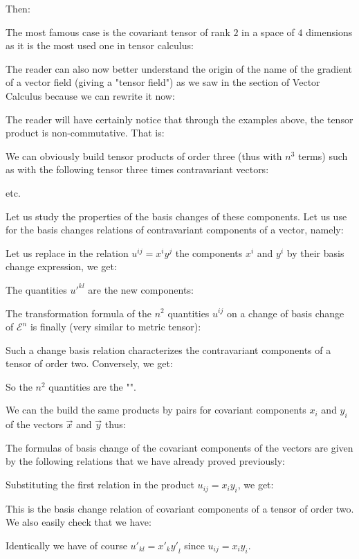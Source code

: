 	Then:
	
	The most famous case is the covariant tensor of rank $2$ in a space of $4$ dimensions as it is the most used one in tensor calculus:
	
	The reader can also now better understand the origin of the name of the gradient of a vector field (giving a "tensor field") as we saw in the section of Vector Calculus because we can rewrite it now:
	
	 The reader will have certainly notice that through the examples above, the tensor product is non-commutative. That is:
	
	We can obviously build tensor products of order three (thus with $n^3$ terms) such as with the following tensor three times  contravariant vectors:
	
	etc.

	Let us study the properties of the basis changes of these components. Let us use for the basis changes relations of contravariant components of a vector, namely:
	
	Let us replace in the relation $u^{ij}=x^iy^j$ the components $x^i$ and $y^i$ by their basis change expression, we get:
	
	The quantities ${u'}^{kl}$ are the new components:
	
	The transformation formula of the $n^2$ quantities $u^{ij}$ on a change of basis change of $\mathcal{E}^n$ is finally (very similar to metric tensor):
	
	Such a change basis relation characterizes the contravariant components of a tensor of order two. Conversely, we get:
	
	So the $n^2$ quantities are the "".

	We can the build the same products by pairs for covariant components $x_i$ and $y_i$ of the vectors $\vec{x}$ and $\vec{y}$ thus:
	
	The formulas of basis change of the covariant components of the vectors are given by the following relations that we have already proved previously:
	
	Substituting the first relation in the product $u_{ij}=x_iy_i$, we get:
	
	This is the basis change relation of covariant components of a tensor of order two. We also easily check that we have:
	
	Identically we have of course ${u'}_{kl}={x'}_k{y'}_l$ since $u_{ij}=x_iy_i$.

